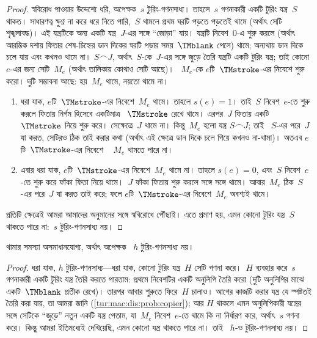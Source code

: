 \documentclass[../../../include/open-logic-section]{subfiles}
\begin{document}
\begin{proof}
স্ববিরোধ পাওয়ার উদ্দেশ্যে ধরি, অপেক্ষক~$s$ টুরিং-গণনসাধ্য। তাহলে~$s$
গণনাকারী একটি টুরিং যন্ত্র~$S$ থাকত। সাধারণত্ব ক্ষুণ্ণ না করে ধরে নিতে
পারি,~$S$ থামলে প্রথম ঘরটি পড়তে পড়তেই থামে (অর্থাৎ সেটি শৃঙ্খলাবদ্ধ)।
এই যন্ত্রটিকে অন্য একটি যন্ত্র~$J$-এর সঙ্গে “জোড়া” যায়। যন্ত্রটি নিবেশ~$0$-এ
শুরু করলে (অর্থাৎ আরম্ভিক দশায় ফিতার শেষ-চিহ্নের ডান দিকের ঘরটি পড়ার
সময়~$\TMblank$ পেলে) থামে; অন্যথায় ডান দিকে চলে যায় এবং কখনও থামে না।
$S \frown J$, অর্থাৎ~$S$-কে~$J$-এর সঙ্গে জুড়ে তৈরি যন্ত্রটি একটি টুরিং
যন্ত্র; তাই কোনো~$e$-এর জন্য সেটি~$M_e$ (অর্থাৎ তালিকায় কোথাও সেটি আছে)।
~$M_e$-কে $e$টি~$\TMstroke$-এর নিবেশে শুরু করো। দুটি সম্ভাবনা আছে:
হয়~$M_e$ থামে, নয়তো থামে না।
\begin{enumerate}
\item ধরা যাক, $e$টি~$\TMstroke$-এর নিবেশে~$M_e$ থামে। তাহলে $s(e)
  = 1$। তাই~$S$ নিবেশ~$e$-তে শুরু করলে ফিতায় নির্গম হিসেবে একটিমাত্র
  ~$\TMstroke$ রেখে থামে। এরপর~$J$ ফিতায় একটি~$\TMstroke$ নিয়ে শুরু করে।
  সেক্ষেত্রে~$J$ থামে না। কিন্তু~$M_e$ হলো যন্ত্র $S \frown J$; তাই
  ~$S$-এর পরে~$J$ যা করত, সেটিরও ঠিক তাই করার কথা (অর্থাৎ এই ক্ষেত্রে
  ডান দিকে চলে গিয়ে কখনও না-থামা)। অতএব $e$টি~$\TMstroke$-এর নিবেশে
  ~ $M_e$ থামতে পারে না।

\item এবার ধরা যাক, $e$টি~$\TMstroke$-এর নিবেশে~$M_e$ থামে না। তাহলে
  $s(e) = 0$, এবং~$S$ নিবেশ~$e$-তে শুরু করে ফাঁকা ফিতা নিয়ে থামে।~$J$
  ফাঁকা ফিতায় শুরু করলে সঙ্গে সঙ্গে থামে। আবার~$M_e$ ঠিক~$S$-এর পরে~$J$
  যা করত তাই করে; ফলে $e$টি~$\TMstroke$-এর নিবেশে~$M_e$ অবশ্যই থামে।
\end{enumerate}
প্রতিটি ক্ষেত্রেই আমরা আমাদের অনুমানের সঙ্গে স্ববিরোধে পৌঁছাই। এতে প্রমাণ
হয়, এমন কোনো টুরিং যন্ত্র~$S$ থাকতে পারে না:~$s$ টুরিং-গণনসাধ্য নয়।

\end{proof}

\begin{thm}
 থামার সমস্যা অসমাধানযোগ্য, অর্থাৎ অপেক্ষক
~$h$ টুরিং-গণনসাধ্য নয়।
\end{thm}

\begin{proof}
ধরা যাক, $h$ টুরিং-গণনসাধ্য—ধরা যাক, কোনো টুরিং যন্ত্র~$H$ সেটি গণনা
করে।~$H$ ব্যবহার করে~$s$ গণনাকারী একটি টুরিং যন্ত্র তৈরি করতে পারতাম:
প্রথমে নিবেশটির একটি অনুলিপি তৈরি করো (দুটি অনুলিপির মাঝে একটি~$\TMblank$
প্রতীক রেখে)। তারপর আবার শুরুতে ফিরে~$H$ চালাও। আগের কাজটি করার যন্ত্র যে
স্পষ্টতই তৈরি করা যায়, তা আমরা জানি (\cref{tur:mac:dis:prob:copier}); আর
$H$ থাকলে এমন অনুলিপিকারী যন্ত্রের সঙ্গে সেটিকে “জুড়ে” নতুন একটি যন্ত্র
পেতাম, যা~$M_e$ নিবেশ~$e$-তে থামে কি না নির্ধারণ করে, অর্থাৎ~$s$ গণনা
করে। কিন্তু আমরা ইতিমধ্যেই দেখিয়েছি, এমন কোনো যন্ত্র থাকতে পারে না। তাই
~$h$-ও টুরিং-গণনসাধ্য নয়।
\end{proof}
\end{document}
